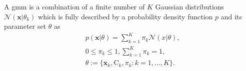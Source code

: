 \begin{definition}\label{def:gmm} \cite[p. 315]{dei_2020}
A \acrlong{gmm} is a combination of a finite number of $K$ Gaussian distributions $\mathcal{N}(\bm{x}|\theta_k)$ which is fully described by a probability density function $p$ and its parameter set $\theta$ as
\begin{equation}\label{eq:gmm_def}
    \begin{aligned}
        &p(\bm{x}|\theta) = \sum\limits_{k=1}^K \pi_k \mathcal{N}(x | \theta), \\
        &0 \leq \pi_k \leq 1, \sum\limits_{k=1}^K \pi_k = 1, \\
        &\theta := \{\overline{\bm{x}}_k, \bm{\mathrm{C}}_k, \pi_k : k = 1, \dots, K \}.
    \end{aligned}
\end{equation}
\end{definition}




